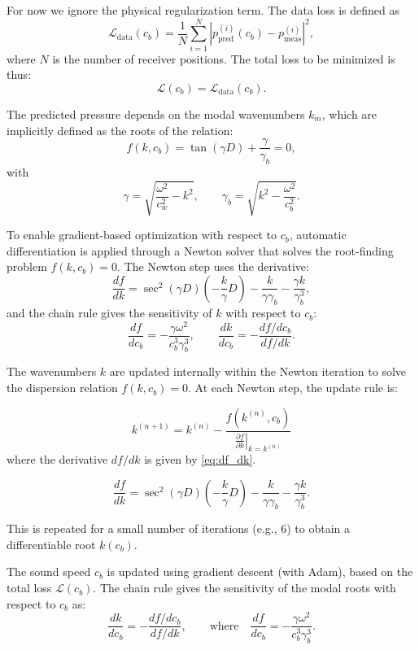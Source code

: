 \documentclass[conference]{IEEEtran}
\begin{document}
For now we ignore the physical regularization term. The data loss is defined as
\[
\mathcal{L}_{\text{data}}(c_b) = \frac{1}{N} \sum_{i=1}^N \left| p^{(i)}_{\text{pred}}(c_b) - p^{(i)}_{\text{meas}} \right|^2,
\]
where \( N \) is the number of receiver positions. The total loss to be minimized is thus:
\[
\mathcal{L}(c_b) = \mathcal{L}_{\text{data}}(c_b).
\]

The predicted pressure depends on the modal wavenumbers \( k_m \), which are implicitly defined as the roots of the relation:
\begin{equation}
f(k, c_b) = \tan(\gamma D) + \frac{\gamma}{\gamma_b} = 0,
\label{eq:transcendental_eq}
\end{equation}
with
\[
\gamma = \sqrt{\frac{\omega^2}{c_w^2} - k^2}, \qquad
\gamma_b = \sqrt{k^2 - \frac{\omega^2}{c_b^2}}.
\]

To enable gradient-based optimization with respect to \( c_b \), automatic differentiation is applied through a Newton solver that solves the root-finding problem \( f(k, c_b) = 0 \). The Newton step uses the derivative:
\begin{equation}
\frac{df}{dk} = \sec^2(\gamma D)\left(-\frac{k}{\gamma} D\right)
               - \frac{k}{\gamma \gamma_b}
               - \frac{\gamma k}{\gamma_b^3},
\label{eq:df_dk}
\end{equation}
and the chain rule gives the sensitivity of \( k \) with respect to \( c_b \):
\[
\frac{df}{dc_b} = -\frac{\gamma \omega^2}{c_b^3 \gamma_b^3}, \qquad
\frac{dk}{dc_b} = -\frac{df/dc_b}{df/dk}.
\]

The wavenumbers \( k \) are updated internally within the Newton iteration to solve the dispersion relation \( f(k, c_b) = 0 \). At each Newton step, the update rule is:

\begin{equation}
k^{(n+1)} = k^{(n)} - \frac{f(k^{(n)}, c_b)}{\left.\frac{\partial f}{\partial k}\right|_{k = k^{(n)}}}
\label{eq:newton_knplus1}
\end{equation}
where the derivative \( df/dk \) is given by \eqref{eq:df_dk}.


\[
\frac{df}{dk} = \sec^2(\gamma D)\left(-\frac{k}{\gamma} D\right)
               - \frac{k}{\gamma \gamma_b}
               - \frac{\gamma k}{\gamma_b^3}.
\]

This is repeated for a small number of iterations (e.g., 6) to obtain a differentiable root \( k(c_b) \).

The sound speed \( c_b \) is updated using gradient descent (with Adam), based on the total loss \( \mathcal{L}(c_b) \). The chain rule gives the sensitivity of the modal roots with respect to \( c_b \) as:
\[
\frac{dk}{dc_b} = -\frac{df/dc_b}{df/dk}, \qquad
\text{where} \quad \frac{df}{dc_b} = -\frac{\gamma \omega^2}{c_b^3 \gamma_b^3}.
\]
\end{document}

